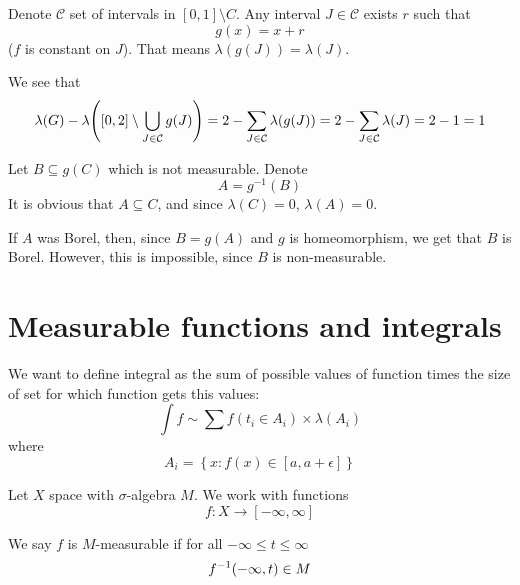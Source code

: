 Denote $\mathcal{C}$ set of intervals in $[0,1]\setminus C$. Any interval $J\in \mathcal{C}$ exists $r$ such that
$$g(x) = x+r$$
($f$ is constant on $J$). That means $\lambda(g(J))=\lambda(J)$.

We see that
$$\lambda(G) - \lambda\qty([0,2] \setminus \bigcup_{J\in \mathcal{C}} g(J)) = 2 - \sum_{J\in \mathcal{C}} \lambda(g(J)) = 2- \sum_{J\in \mathcal{C}} \lambda(J) = 2-1=1$$

Let $B\subseteq g(C)$ which is not measurable. Denote
$$A = g^{-1}(B)$$
It is obvious that $A\subseteq C$, and since $\lambda(C)=0$, $\lambda(A)=0$.

If $A$ was Borel, then, since
$B=g(A)$ and $g$ is homeomorphism, we get that $B$ is Borel. However, this is impossible, since $B$ is non-measurable.
\section{Measurable functions and integrals}
We want to define integral as the sum of possible values of function times the size of set for which function gets this values:
$$\int f \sim \sum f(t_i \in A_i) \times \lambda(A_i)$$
where
$$A_i = \left\{ x: f(x) \in [a,a+\epsilon] \right\}$$

Let $X$ space with $\sigma$-algebra $M$. We work with functions
$$f: X \to [-\infty, \infty]$$

\begin{definition}
	We say $f$ is $M$-measurable if for all $-\infty\leq t\leq \infty$ 
	$$f^{-1} \qty(-\infty,t) \in M$$
\end{definition}


